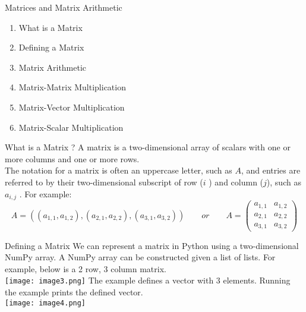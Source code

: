 \documentclass{beamer}
\begin{document}
\begin{frame}{Matrices and Matrix Arithmetic}
\begin{flushleft}
	\begin{enumerate}
		\item What is a Matrix
		\item Defining a Matrix
		\item Matrix Arithmetic
		\item Matrix-Matrix Multiplication
		\item Matrix-Vector Multiplication
		\item Matrix-Scalar Multiplication
	\end{enumerate}
\end{flushleft}
\begin{block}{What is a Matrix ?}
A matrix is a two-dimensional array of scalars with one or more columns and one or more rows.\\
\vspace{5pt}
The notation for a matrix is often an uppercase letter, such as $A$, and entries are referred to by their two-dimensional subscript of row ($i$	) and column ($j$), such as $a_{i,j}$ . For example:
\vspace{-17pt}
\begin{equation*}
	A = ((a_{1,1}, a_{1,2}),(a_{2,1}, a_{2,2}),(a_{3,1}, a_{3,2}))
	\qquad or \qquad 
	A = \begin{pmatrix}
    		a_{1,1} & a_{1,2} \\
    		a_{2,1} & a_{2,2} \\
    		a_{3,1} & a_{3,2}
  		\end{pmatrix}
\end{equation*}
\end{block}
\end{frame}

\begin{frame}
\begin{block}{Defining a Matrix}
	We can represent a matrix in Python using a two-dimensional NumPy array. A NumPy array can be constructed given a list of lists. For example, below is a 2 row, 3 column matrix. \\
	\vspace{10pt}
	\texttt{[image: image3.png]}
	The example defines a vector with 3 elements. Running the example prints the  defined vector. \\
	\vspace{10pt}
	\texttt{[image: image4.png]}
\end{block}
\end{frame}
\end{document}
